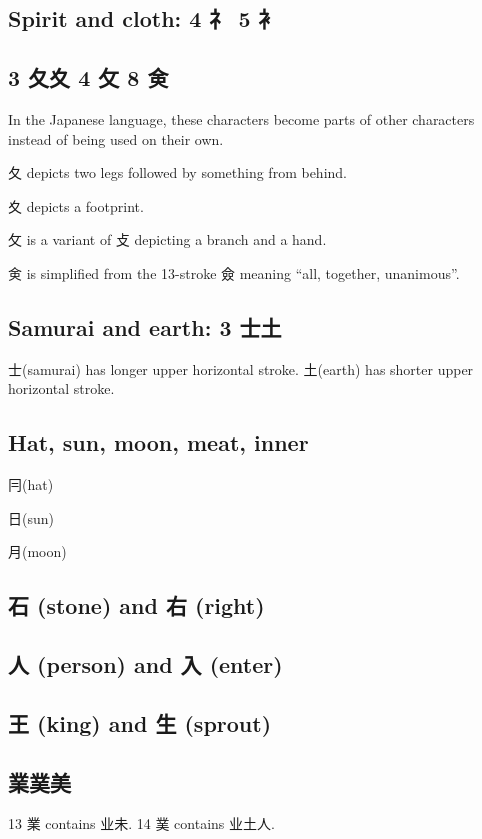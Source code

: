\subsection{Spirit and cloth: 4 礻 5 衤}

\subsection{3 夂夊 4 攵 8 㑒}

In the Japanese language,
these characters become parts of other characters
instead of being used on their own.

夂 depicts two legs followed by something from behind.

夊 depicts a footprint.

攵 is a variant of 攴 depicting a branch and a hand.

㑒 is simplified from the 13-stroke 僉
meaning ``all, together, unanimous''.

\subsection{Samurai and earth: 3 士土}

士(samurai) has longer upper horizontal stroke.
土(earth) has shorter upper horizontal stroke.

\subsection{Hat, sun, moon, meat, inner}

冃(hat)

日(sun)

月(moon)

\subsection{石 (stone) and 右 (right)}

\subsection{人 (person) and 入 (enter)}

\subsection{王 (king) and 生 (sprout)}

\subsection{業菐美}

13 業 contains 业未.
14 菐 contains 业土人.
